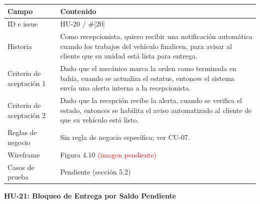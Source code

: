 {\def\LTcaptype{none} %
\begin{longtable}[]{@{}
  >{\raggedright\arraybackslash}p{}
  >{\raggedright\arraybackslash}p{}@{}}
\toprule\noalign{}
\begin{minipage}[b]{\linewidth}\raggedright
\textbf{Campo}
\end{minipage} & \begin{minipage}[b]{\linewidth}\raggedright
\textbf{Contenido}
\end{minipage} \\
\midrule\noalign{}
\endhead
\bottomrule\noalign{}
\endlastfoot
ID e issue & HU-20 / \#{[}20{]} \\
Historia & Como recepcionista, quiero recibir una notificación
automática cuando los trabajos del vehículo finalicen, para avisar al
cliente que su unidad está lista para entrega. \\
Criterio de aceptación 1 & Dado que el mecánico marca la orden como
terminada en bahía, cuando se actualiza el estatus, entonces el sistema
envía una alerta interna a la recepcionista. \\
Criterio de aceptación 2 & Dado que la recepción recibe la alerta,
cuando se verifica el estado, entonces se habilita el aviso automatizado
al cliente de que su vehículo está listo. \\
Reglas de negocio & Sin regla de negocio específica; ver CU-07. \\
Wireframe & Figura 4.10 \textcolor{red}{(imagen pendiente)} \\
Casos de prueba & Pendiente (sección 5.2) \\
\end{longtable}
}

\textbf{HU-21: Bloqueo de Entrega por Saldo Pendiente}


